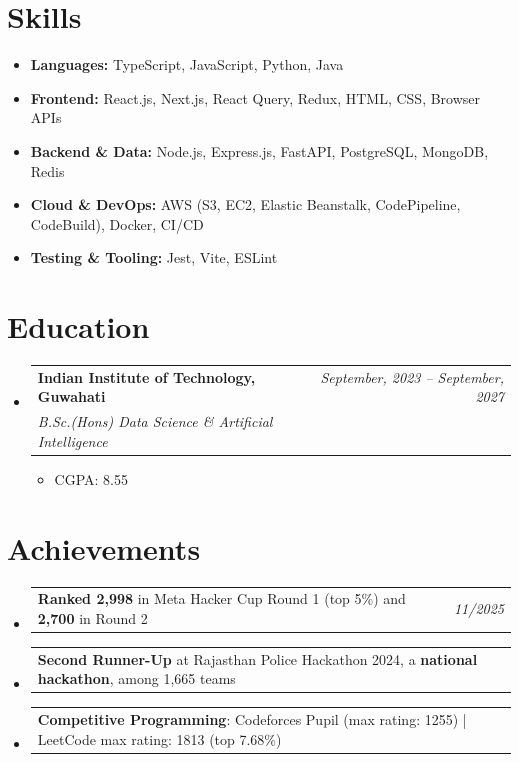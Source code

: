 \documentclass[a4paper,11pt]{article}
\makeatletter
\newcommand{\resumeItem}[2]{
  \item{
    \textbf{#1}{\hspace{0.5mm}#2 \vspace{-0.5mm}}
  }
}
\newcommand{\resumePOR}[3]{
\vspace{0.5mm}\item
    \begin{tabular*}{0.97\textwidth}[t]{l@{\extracolsep{\fill}}r}
        \textbf{#1}\hspace{0.3mm}#2 & \textit{\small{#3}} 
    \end{tabular*}
    \vspace{-2mm}
}
\newcommand{\resumeSubheading}[4]{
\vspace{0.5mm}\item
    \begin{tabular*}{0.98\textwidth}[t]{l@{\extracolsep{\fill}}r}
        \textbf{#1} & \textit{\footnotesize{#4}} \\
        \textit{\footnotesize{#3}} &  \footnotesize{#2}\\
    \end{tabular*}
    \vspace{-2.4mm}
}
\newcommand{\resumeSubItem}[2]{\resumeItem{#1}{#2}\vspace{-4pt}}
\newcommand{\resumeSubHeadingListStart}{\begin{itemize}[leftmargin=*,labelsep=1mm]}
\newcommand{\resumeHeadingSkillStart}{\begin{itemize}[leftmargin=*,itemsep=1.7mm, rightmargin=2ex]}
\newcommand{\resumeItemListStart}{\begin{itemize}[leftmargin=*,labelsep=1mm,itemsep=0.5mm]}
\newcommand{\resumeSubHeadingListEnd}{\end{itemize}\vspace{2mm}}
\newcommand{\resumeHeadingSkillEnd}{\end{itemize}\vspace{-2mm}}
\newcommand{\resumeItemListEnd}{\end{itemize}\vspace{-2mm}}
\makeatother
\begin{document}
\section{\textbf{Skills}}
\vspace{-0.4mm}
 \resumeHeadingSkillStart
  \resumeSubItem{Languages: }
    {TypeScript, JavaScript, Python, Java}
    \vspace{1mm}
  \resumeSubItem{Frontend: }
    {React.js, Next.js, React Query, Redux, HTML, CSS, Browser APIs}
    \vspace{1mm}
  \resumeSubItem{Backend \& Data: }
    {Node.js, Express.js, FastAPI, PostgreSQL, MongoDB, Redis}
    \vspace{1mm}
  \resumeSubItem{Cloud \& DevOps: }
    {AWS (S3, EC2, Elastic Beanstalk, CodePipeline, CodeBuild), Docker, CI/CD}
    \vspace{1mm}
  \resumeSubItem{Testing \& Tooling: }
    {Jest, Vite, ESLint}
 \resumeHeadingSkillEnd
\vspace{-2mm}


\section{\textbf{Education}}
\vspace{-0.4mm}
\resumeSubHeadingListStart

\resumeSubheading
{Indian Institute of Technology, Guwahati}{}
{B.Sc.(Hons) Data Science \& Artificial Intelligence}{September, 2023 -- September, 2027}
\resumeItemListStart
\item CGPA: 8.55
\resumeItemListEnd

\resumeSubHeadingListEnd
\vspace{-6mm}


\section{\textbf{Achievements}}
\vspace{-0.2mm}
\resumeSubHeadingListStart
\resumePOR{}{\textbf{Ranked 2,998} in Meta Hacker Cup Round 1 (top 5\%) and \textbf{2,700} in Round 2}{\textit{11/2025}}
\resumePOR{}{\textbf{Second Runner-Up} at Rajasthan Police Hackathon 2024, a \textbf{national hackathon}, among 1,665 teams}{}
\resumePOR{}{\textbf{Competitive Programming}: Codeforces Pupil (max rating: 1255) | LeetCode max rating: 1813 (top 7.68\%)}{}
\resumeSubHeadingListEnd
\vspace{-6mm}

\end{document}
